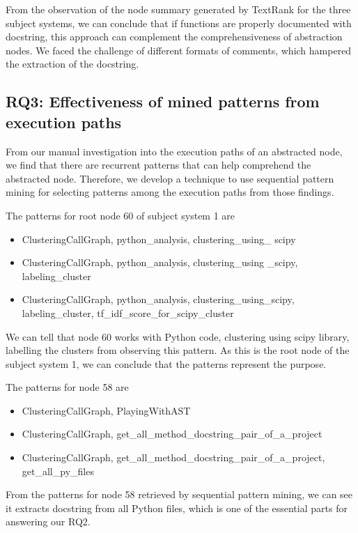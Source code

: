 From the observation of the node summary generated by TextRank for the three subject systems, we can conclude that if functions are properly documented with docstring, this approach can complement the comprehensiveness of abstraction nodes. We faced the challenge of different formats of comments, which hampered the extraction of the docstring.  
 

\subsection{ RQ3: Effectiveness of mined patterns from execution paths}
From our manual investigation into the execution paths of an abstracted node, we find that there are recurrent patterns that can help comprehend the abstracted node. Therefore, we develop a technique to use sequential pattern mining for selecting patterns among the execution paths from those findings. 

The patterns for root node 60 of subject system 1 are

\begin{itemize}
    \item ClusteringCallGraph, python\_analysis, clustering\_using\_
    scipy
    \item ClusteringCallGraph, python\_analysis, clustering\_using
    \_scipy, labeling\_cluster
    \item ClusteringCallGraph, python\_analysis, clustering\_using\_scipy,
labeling\_cluster, tf\_idf\_score\_for\_scipy\_cluster
\end{itemize}
We can tell that node 60 works with Python code, clustering using scipy library, labelling the clusters from observing this pattern. As this is the root node of the subject system 1, we can conclude that the patterns represent the purpose.

The patterns for node 58 are 

\begin{itemize}
    \item ClusteringCallGraph, PlayingWithAST
    \item ClusteringCallGraph, get\_all\_method\_docstring\_pair\_of\_a\_project
    \item ClusteringCallGraph, get\_all\_method\_docstring\_pair\_of\_a\_project, get\_all\_py\_files
\end{itemize}
From the patterns for node 58 retrieved by sequential pattern mining, we can see it extracts docstring from all Python files, which is one of the essential parts for answering our RQ2. 

